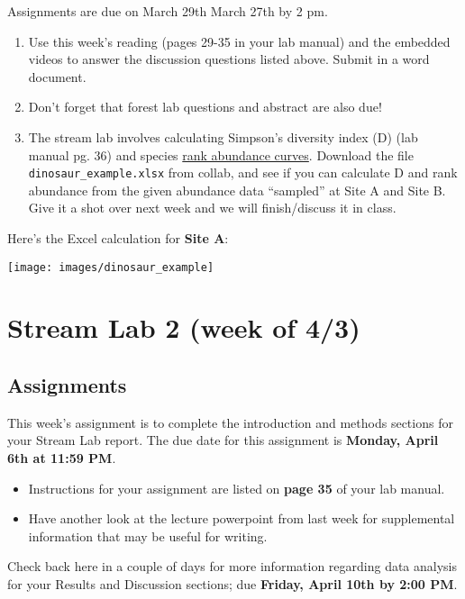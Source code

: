 \documentclass[]{book}
\providecommand{\tightlist}{%
  \setlength{\itemsep}{0pt}\setlength{\parskip}{0pt}}
\begin{document}
Assignments are due on March 29th March 27th by 2 pm.

\begin{enumerate}
\def\labelenumi{\arabic{enumi}.}
\item
  Use this week's reading (pages 29-35 in your lab manual) and the
  embedded videos to answer the discussion questions listed above.
  Submit in a word document.
\item
  Don't forget that forest lab questions and abstract are also due!
\item
  The stream lab involves calculating Simpson's diversity index (D) (lab
  manual pg. 36) and species
  \href{https://en.wikipedia.org/wiki/Rank_abundance_curve}{rank
  abundance curves}. Download the file \texttt{dinosaur\_example.xlsx}
  from collab, and see if you can calculate D and rank abundance from
  the given abundance data ``sampled'' at Site A and Site B. Give it a
  shot over next week and we will finish/discuss it in class.
\end{enumerate}

Here's the Excel calculation for \textbf{Site A}:

\begin{center}\texttt{[image: images/dinosaur\_example]} \end{center}

\chapter{Stream Lab 2 (week of 4/3)}\label{stream-lab-2-week-of-43}

\section{Assignments}\label{assignments-1}

This week's assignment is to complete the introduction and methods
sections for your Stream Lab report. The due date for this assignment is
\textbf{Monday, April 6th at 11:59 PM}.

\begin{itemize}
\tightlist
\item
  Instructions for your assignment are listed on \textbf{page 35} of
  your lab manual.
\item
  Have another look at the lecture powerpoint from last week for
  supplemental information that may be useful for writing.
\end{itemize}

Check back here in a couple of days for more information regarding data
analysis for your Results and Discussion sections; due \textbf{Friday,
April 10th by 2:00 PM}.
\end{document}
